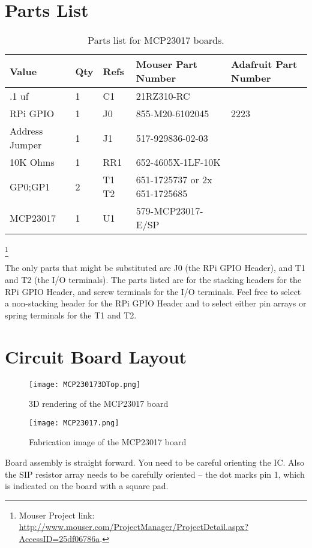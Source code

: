 \section{Parts List}

\begin{table}[htdp]
\begin{centering}\begin{tabular}{|l|l|p{1in}|l|p{.5in}|}
\hline
Value&Qty&Refs&Mouser Part Number&Adafruit Part Number\\
\hline
.1 uf&1&C1&21RZ310-RC&\\
\hline
RPi GPIO&1&J0&855-M20-6102045&2223\\
\hline
Address Jumper&1&J1&517-929836-02-03&\\
\hline
10K Ohms&1&RR1&652-4605X-1LF-10K&\\
\hline
GP0;GP1&2&T1 T2&651-1725737 or 2x 651-1725685&\\
\hline
MCP23017&1&U1&579-MCP23017-E/SP&\\
\hline
\end{tabular}
\caption{Parts list for MCP23017 boards.}
\end{centering}\end{table}\footnote{Mouser Project link: 
\url{http://www.mouser.com/ProjectManager/ProjectDetail.aspx?AccessID=25df06786a}.}

The only parts that might be substituted are J0 (the RPi GPIO Header), and T1
and T2 (the I/O terminals). The parts listed are for the stacking headers for 
the RPi GPIO Header, and screw terminals for the I/O terminals.  Feel free to 
select a non-stacking header for the RPi GPIO Header and to select either pin 
arrays or spring terminals for the T1 and T2.                   

\section{Circuit Board Layout}

\begin{figure}[hbpt]\begin{centering}%
\texttt{[image: MCP230173DTop.png]}
\caption{3D rendering of the MCP23017 board}
\end{centering}\end{figure}
\begin{figure}[hbpt]\begin{centering}%
\texttt{[image: MCP23017.png]}
\caption{Fabrication image of the MCP23017 board}
\end{centering}\end{figure}
Board assembly is straight forward. You need to be careful orienting the IC.
Also the SIP resistor array needs to be carefully oriented -- the dot marks
pin 1, which is indicated on the board with a square pad. 

